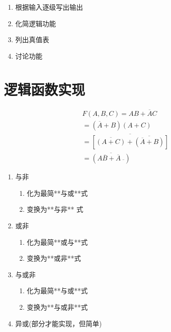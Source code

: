 \newpage

\begin{enumerate}

    \item 根据输入逐级写出输出
    \item 化简逻辑功能
    \item 列出真值表
    \item 讨论功能

\end{enumerate}

\section{逻辑函数实现}

\begin{equation}
    \begin{aligned}
        F(A,B,C)=AB+\overline{A}C                                             \\
        =(\overline{A}+B)(A+C)                                                \\
        =\overline{\left[\overline{(A+C)}+\overline{(\overline{A}+B)}\right]} \\
        =\overline{(A\overline{B}+\overline{A}~\overline{})}
    \end{aligned}
\end{equation}

\newpage

\begin{enumerate}

    \item 与非

          \begin{enumerate}

              \item 化为最简**与或**式
              \item 变换为**与非** 式

          \end{enumerate}

    \item 或非

          \begin{enumerate}

              \item 化为最简**或与**式
              \item 变换为**或非**式

          \end{enumerate}


    \item 与或非

          \begin{enumerate}

              \item 化为最简**与或**式
              \item 变换为**与或非**式

          \end{enumerate}

    \item 异或(部分才能实现，但简单)

\end{enumerate}

